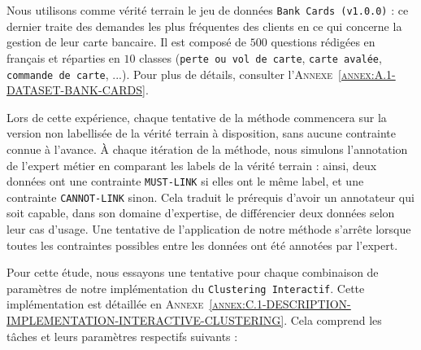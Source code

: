 			Nous utilisons comme vérité terrain le jeu de données \texttt{Bank Cards (v1.0.0)} : ce dernier traite des demandes les plus fréquentes des clients en ce qui concerne la gestion de leur carte bancaire.
			Il est composé de $500$ questions rédigées en français et réparties en $10$ classes (\texttt{perte ou vol de carte}, \texttt{carte avalée}, \texttt{commande de carte}, ...).
			Pour plus de détails, consulter l'\textsc{Annexe~\ref{annex:A.1-DATASET-BANK-CARDS}}.
			
			Lors de cette expérience, chaque tentative de la méthode commencera sur la version non labellisée de la vérité terrain à disposition, sans aucune contrainte connue à l'avance.
			À chaque itération de la méthode, nous simulons l'annotation de l'expert métier en comparant les labels de la vérité terrain : ainsi, deux données ont une contrainte \texttt{MUST-LINK} si elles ont le même label, et une contrainte \texttt{CANNOT-LINK} sinon.
			Cela traduit le prérequis d'avoir un annotateur qui soit capable, dans son domaine d'expertise, de différencier deux données selon leur cas d'usage.
			Une tentative de l'application de notre méthode s'arrête lorsque toutes les contraintes possibles entre les données ont été annotées par l'expert.

			Pour cette étude, nous essayons une tentative pour chaque combinaison de paramètres de notre implémentation du \texttt{Clustering Interactif}.
			Cette implémentation est détaillée en \textsc{Annexe~\ref{annex:C.1-DESCRIPTION-IMPLEMENTATION-INTERACTIVE-CLUSTERING}}.
			Cela comprend les tâches et leurs paramètres respectifs suivants :
		
